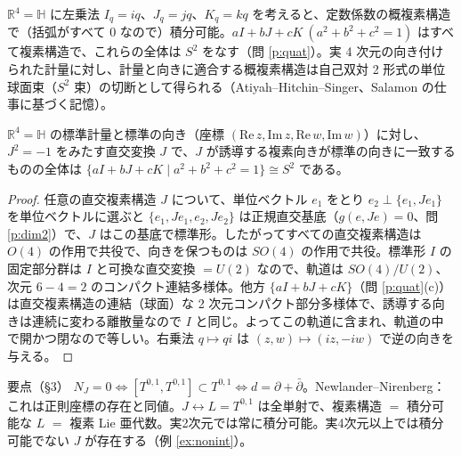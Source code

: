 \begin{ex}[実 4 次元：四元数的な複素構造]\label{ex:quat}
$\mathbb R^4=\mathbb H$ に左乗法 $I_q=iq$、$J_q=jq$、$K_q=kq$ を考えると、定数係数の概複素構造で（括弧がすべて $0$ なので）積分可能。$aI+bJ+cK\ (a^2+b^2+c^2=1)$ はすべて複素構造で、これらの全体は $S^2$ をなす（問 \ref{p:quat}）。実 4 次元の向き付けられた計量に対し、計量と向きに適合する概複素構造は自己双対 2 形式の単位球面束（$S^2$ 束）の切断として得られる（Atiyah--Hitchin--Singer、Salamon の仕事に基づく記憶\tQ）。
\end{ex}

\begin{prop}\label{prop:S2}\tP
$\mathbb R^4=\mathbb H$ の標準計量と標準の向き（座標 $(\mathrm{Re}\,z,\mathrm{Im}\,z,\mathrm{Re}\,w,\mathrm{Im}\,w)$）に対し、$J^2=-1$ をみたす直交変換 $J$ で、$J$ が誘導する複素向きが標準の向きに一致するものの全体は $\{aI+bJ+cK\mid a^2+b^2+c^2=1\}\cong S^2$ である。
\end{prop}
\begin{proof}
任意の直交複素構造 $J$ について、単位ベクトル $e_1$ をとり $e_2\perp\{e_1,Je_1\}$ を単位ベクトルに選ぶと $\{e_1,Je_1,e_2,Je_2\}$ は正規直交基底（$g(e,Je)=0$、問 \ref{p:dim2}）で、$J$ はこの基底で標準形。したがってすべての直交複素構造は $O(4)$ の作用で共役で、向きを保つものは $SO(4)$ の作用で共役。標準形 $I$ の固定部分群は $I$ と可換な直交変換 $=U(2)$ なので、軌道は $SO(4)/U(2)$、次元 $6-4=2$ のコンパクト連結多様体。他方 $\{aI+bJ+cK\}$（問 \ref{p:quat}(c)）は直交複素構造の連結（球面）な 2 次元コンパクト部分多様体で、誘導する向きは連続に変わる離散量なので $I$ と同じ。よってこの軌道に含まれ、軌道の中で開かつ閉なので等しい。右乗法 $q\mapsto qi$ は $(z,w)\mapsto(iz,-iw)$ で逆の向きを与える。\qedhere
\end{proof}


\begin{keybox}{要点（§3）}
$N_J=0\iff[T^{0,1},T^{0,1}]\subset T^{0,1}\iff d=\partial+\bar\partial$。Newlander--Nirenberg：これは正則座標の存在と同値。$J\leftrightarrow L=T^{0,1}$ は全単射で、複素構造 $=$ 積分可能な $L$ $=$ 複素 Lie 亜代数。実2次元では常に積分可能。実4次元以上では積分可能でない $J$ が存在する（例 \ref{ex:nonint}）。
\end{keybox}

